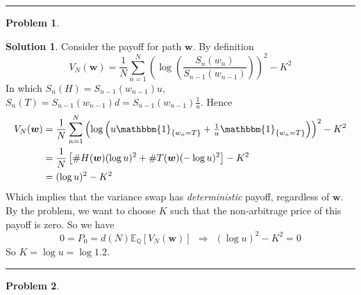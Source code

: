 \documentclass[a4paper, 10pt]{article}
\theoremstyle{definition}
\newtheorem{problem}{Problem}
\theoremstyle{hSol}
\newtheorem*{solution}{Solution}
\begin{document}
\noindent\rule{16cm}{0.4pt}
\begin{problem} 
\end{problem}
\begin{solution} Consider the payoff for path $\bm{w}$. By definition
\begin{equation}
  V_N(\bm{w}) = \frac{1}{N} \sum_{n=1}^N \left(\log\left(\frac{S_{n}(w_n)}{S_{n-1}(w_{n-1})}\right)\right)^2 - K^2
\end{equation}
In which $S_{n}(H) = S_{n-1}(w_{n-1})u$, $S_{n}(T) = S_{n-1}(w_{n-1})d = S_{n-1}(w_{n-1})\frac{1}{u}$. Hence
\begin{equation}
  \begin{split}
    V_N(\bm{w}) &= \frac{1}{N} \sum_{n=1}^N  \left(\log\left( u\mathbbm{1}_{\{w_n=T\}} + \tfrac{1}{u}\mathbbm{1}_{\{w_n=T\}}\right)\right)^2 - K^2 \\
    &= \frac{1}{N}\left[\#H(\bm{w})(\log u)^2 + \#T(\bm{w})(-\log u)^2\right] - K^2\\
    &= (\log u)^2 - K^2
  \end{split}
\end{equation}
Which implies that the variance swap has \textit{deterministic} payoff, regardless of $\bm{w}$. By the problem, we want to choose $K$ such that the non-arbitrage price of this payoff is zero. So we have
$$
0 = P_0 = d(N) \mathbb{E}_{\mathbb{Q}}\left[V_N(\bm{w})\right]~~\Rightarrow~~(\log u)^2 - K^2=0
$$
So $K=\log u = \log 1.2$.
\end{solution}
\newpage
\noindent\rule{16cm}{0.4pt}
\begin{problem} 
\end{problem}
\end{document}
